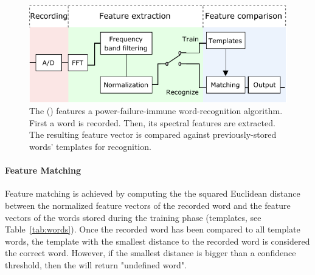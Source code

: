 \begin{figure}
	\centering
	\includegraphics[width=\columnwidth]{figures/cis}
	\caption{The \fullCIM (\cim) features a power-failure-immune word-recognition algorithm. First a word is recorded. Then, its spectral features are extracted. The resulting feature vector is compared against previously-stored words' templates for recognition.}
	\label{fig:cis}
\end{figure}

\paragraph{Feature Matching}
Feature matching is achieved by computing the the squared Euclidean distance between the normalized feature vectors of the recorded word and the feature vectors of the words stored during the training phase (templates, see Table~\ref{tab:words}). 
Once the recorded word has been compared to all template words, the template with the smallest distance to the recorded word is considered the correct word. However, if the smallest distance is bigger than a confidence threshold, then the \cim will return "undefined word". 

